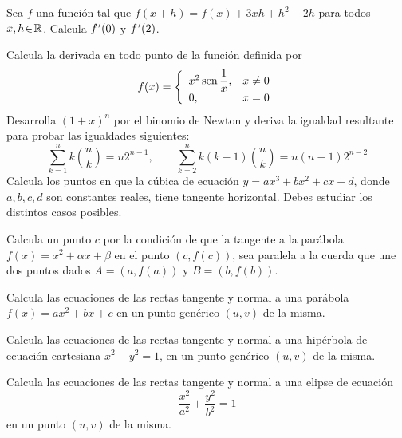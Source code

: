 \begin{ejercicios propuestos}
\propuesto Sea $f$ una función tal que $f(x+h)=f(x)+3xh+h^{2}-2h$
para todos $x,h\!\in\!\mathbb R$. Calcula $f\mbox{$^{\mspace{2mu}\prime}$}(0)$ y $f\mbox{$^{\mspace{2mu}\prime}$}(2)$.

\propuesto Calcula la derivada en todo punto de la función definida
por 
\[
f(x)=\left\{ \begin{array}{ll}
x^{2}\operatorname{sen}\dfrac{1}{x}, & x\neq0\\
0, & x=0
\end{array}\right.
\]
\propuesto Desarrolla $(1+x)^{n}$ por el binomio de Newton y deriva
la igualdad resultante para probar las igualdades siguientes: 
\[
\sum_{k=1}^{n}k\binom{n}{k}=n2^{n-1},\qquad\sum_{k=2}^{n}k(k-1)\binom{n}{k}=n(n-1)2^{n-2}
\]
\propuesto Calcula los puntos en que la cúbica de ecuación $y=ax^{3}+bx^{2}+cx+d$,
donde $a,b,c,d$ son constantes reales, tiene tangente horizontal.
Debes estudiar los distintos casos posibles.

\propuesto Calcula un punto $c$ por la condición de que la tangente
a la parábola $f(x)=x^{2}+\alpha x+\beta$ en el punto $(c,f(c))$,
sea paralela a la cuerda que une dos puntos dados $A=(a,f(a))$ y
$B=(b,f(b))$.

\propuesto Calcula las ecuaciones de las rectas tangente y normal
a una parábola $f(x)=ax^{2}+bx+c$ en un punto genérico $(u,v)$ de
la misma.

\propuesto Calcula las ecuaciones de las rectas tangente y normal
a una hipérbola de ecuación cartesiana $x^{2}-y^{2}=1$, en un punto
genérico $(u,v)$ de la misma.

\propuesto Calcula las ecuaciones de las rectas tangente y normal
a una elipse de ecuación 
\[
\frac{x^{2}}{a^{2}}+\frac{y^{2}}{b^{2}}=1
\]
en un punto $(u,v)$ de la misma. \end{ejercicios propuestos}

